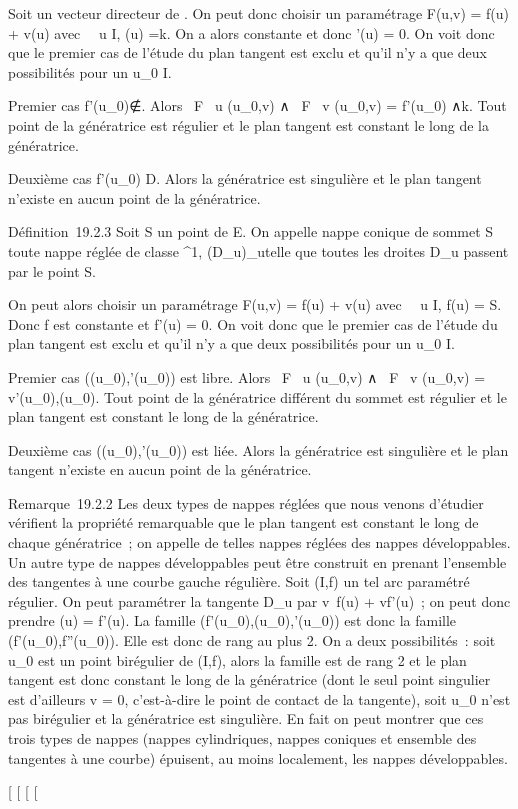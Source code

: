 \documentclass[]{article}
\begin{document}
Soit \veck un vecteur directeur de
\vecD. On peut donc choisir un paramétrage F(u,v) =
f(u) + v\vecg(u) avec \forall~~u \in
I, \vecg(u) =\vec k. On a alors
\vecg constante et donc \vecg'(u)
= 0. On voit donc que le premier cas de l'étude du plan tangent est
exclu et qu'il n'y a que deux possibilités pour un u_0 \in I.

Premier cas
f'(u_0)∉\vecD.
Alors  \partial~F \over \partial~u (u_0,v) ∧ \partial~F
\over \partial~v (u_0,v) = f'(u_0)
∧\vec k. Tout point de la génératrice est régulier et
le plan tangent est constant le long de la génératrice.

Deuxième cas f'(u_0) \in\vec D. Alors la
génératrice est singulière et le plan tangent n'existe en aucun point de
la génératrice.

Définition~19.2.3 Soit S un point de E. On appelle nappe conique de
sommet S toute nappe réglée de classe ^1,
(D_u)_u\inI telle que toutes les droites D_u
passent par le point S.

On peut alors choisir un paramétrage F(u,v) = f(u) +
v\vecg(u) avec \forall~~u \in I, f(u)
= S. Donc f est constante et f'(u) = 0. On voit donc que le premier cas
de l'étude du plan tangent est exclu et qu'il n'y a que deux
possibilités pour un u_0 \in I.

Premier cas
(\vecg(u_0),\vecg'(u_0))
est libre. Alors  \partial~F \over \partial~u (u_0,v) ∧ \partial~F
\over \partial~v (u_0,v) =
v\vecg'(u_0),\vecg(u_0).
Tout point de la génératrice différent du sommet est régulier et le plan
tangent est constant le long de la génératrice.

Deuxième cas
(\vecg(u_0),\vecg'(u_0))
est liée. Alors la génératrice est singulière et le plan tangent
n'existe en aucun point de la génératrice.

Remarque~19.2.2 Les deux types de nappes réglées que nous venons
d'étudier vérifient la propriété remarquable que le plan tangent est
constant le long de chaque génératrice~; on appelle de telles nappes
réglées des nappes développables. Un autre type de nappes développables
peut être construit en prenant l'ensemble des tangentes à une courbe
gauche régulière. Soit (I,f) un tel arc paramétré régulier. On peut
paramétrer la tangente D_u par
v\mapsto~f(u) + vf'(u)~; on peut donc prendre
\vecg(u) = f'(u). La famille
(f'(u_0),\vecg(u_0),\vecg'(u_0))
est donc la famille (f'(u_0),f''(u_0)). Elle est donc
de rang au plus 2. On a deux possibilités~: soit u_0 est un
point birégulier de (I,f), alors la famille est de rang 2 et le plan
tangent est donc constant le long de la génératrice (dont le seul point
singulier est d'ailleurs v = 0, c'est-à-dire le point de contact de la
tangente), soit u_0 n'est pas birégulier et la génératrice est
singulière. En fait on peut montrer que ces trois types de nappes
(nappes cylindriques, nappes coniques et ensemble des tangentes à une
courbe) épuisent, au moins localement, les nappes développables.

[
[
[
[
\end{document}
